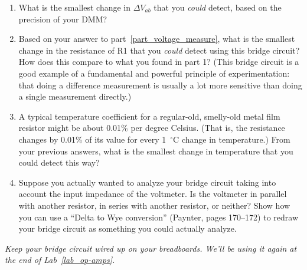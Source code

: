 \begin{enumerate}[wide]
\item What is the smallest change in $\Delta V_{ab}$ that you \textit{could} detect, based on the precision of your DMM? \label{part_voltage_measure}

\item Based on your answer to part~\ref{part_voltage_measure}, what is the smallest change in the resistance of R1 that you \textit{could} detect using this bridge circuit?  How does this compare to what you found in part 1?  (This bridge circuit is a good example of a fundamental and powerful principle of experimentation: that doing a difference measurement is usually a lot more sensitive than doing a single measurement directly.)

\item A typical temperature coefficient for a regular-old, smelly-old metal film resistor might be about 0.01\% per degree Celsius.  (That is, the resistance changes by 0.01\% of its value for every 1~$^\circ$C change in temperature.)  From your previous answers, what is the smallest change in temperature that you could detect this way?

\item Suppose you actually wanted to analyze your bridge circuit taking into account the input impedance of the voltmeter.  Is the voltmeter in parallel with another resistor, in series with another resistor, or neither?  Show how you can use a ``Delta to Wye conversion'' (Paynter, pages 170--172) to redraw your bridge circuit as something you could actually analyze.

\end{enumerate}

\textit{Keep your bridge circuit wired up on your breadboards.  We'll be using it again at the end of Lab~\ref{lab_op-amps}.}






